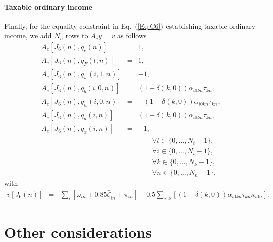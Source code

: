 \documentclass{report}[fleqn,11pt]
\begin{document}
\paragraph*{Taxable ordinary income}
Finally, for the equality constraint in Eq.~(\ref{Eq:C6}) establishing taxable
ordinary income, we add $N_n$ rows to $A_ey = v$ as follows
\begin{eqnarray}
	A_e[J_6(n), q_e(n)] &=& 1, \nonumber \\
	A_e[J_6(n), q_F(t, n)] &=& 1, \nonumber \\
	A_e[J_6(n), q_w(i, 1, n)] &=& -1, \nonumber \\
	A_e[J_6(n), q_b(i, 0, n)] &=&  (1 - \delta(k, 0))\alpha_{i0kn}\tau_{kn}, \\
	A_e[J_6(n), q_w(i, 0, n)] &=& -(1 - \delta(k, 0))\alpha_{i0kn}\tau_{kn}, \nonumber \\
	A_e[J_6(n), q_d(i, n)] &=&     (1 - \delta(k, 0))\alpha_{i0kn}\tau_{kn}, \nonumber \\
	A_e[J_6(n), q_x(i, n)] &=& -1, \nonumber \\
	&&\qquad\forall t \in \{0,\ldots, N_t-1\},\nonumber\\
	&&\qquad\forall i \in \{0,\ldots, N_i-1\},\nonumber\\
	&&\qquad\forall k \in \{0,\ldots, N_k-1\},\nonumber\\
	&&\qquad\forall n \in \{0,\ldots, N_n-1\}, \nonumber
\end{eqnarray}
with
\begin{eqnarray}
	v[J_6(n)] &=& 
	\sum_i [\omega_{in} + 0.85\bar\zeta_{in}  + \pi_{in}]
	+ 0.5\sum_{i,k} [(1-\delta(k, 0))\alpha_{i0kn}\tau_{kn}\kappa_{i0n}].
\end{eqnarray}

\section{Other considerations}
\end{document}
